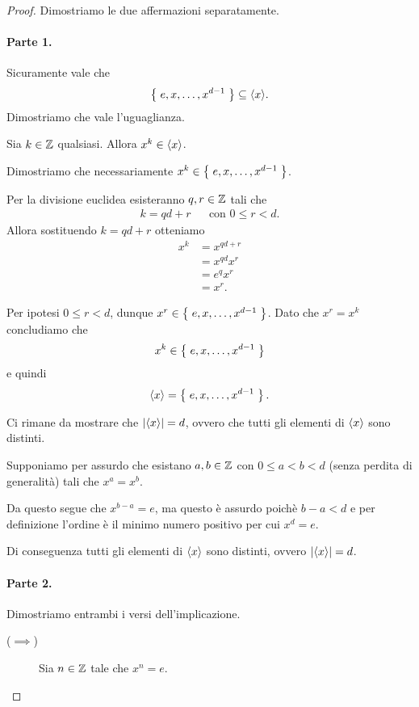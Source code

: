 \begin{proof}
    Dimostriamo le due affermazioni separatamente. 
    
    \paragraph{Parte 1.} Sicuramente vale che \[
        \set{e, x, \dots, x^{d-1}} \subseteq \cycl{x}.    
    \] Dimostriamo che vale l'uguaglianza.

    Sia $k \in \Z$ qualsiasi. Allora $x^k \in \cycl x$. 
    
    Dimostriamo che necessariamente $x^k \in \set{e, x, \dots, x^{d-1}}$.

    Per la divisione euclidea esisteranno $q, r \in \Z$ tali che \begin{align*}
        k = qd + r &&\text{con } 0 \leq r < d.
    \end{align*} Allora sostituendo $k = qd+r$ otteniamo \begin{align*}
        x^k &= x^{qd + r}\\
        &= x^{qd}x^r\\
        &= e^qx^r\\
        &= x^r.
    \end{align*}
    
    Per ipotesi $0 \leq r < d$, dunque $x^r \in \set{e, x, \dots, x^{d-1}}$. Dato che $x^r = x^k$ concludiamo che \[
        x^k \in \set{e, x, \dots, x^{d-1}}    
    \] e quindi \[
        \cycl x = \set{e, x, \dots, x^{d-1}}.    
    \]

    Ci rimane da mostrare che $\abs*{\cycl* x} = d$, ovvero che tutti gli elementi di $\cycl x$ sono distinti. 

    Supponiamo per assurdo che esistano $a, b \in \Z$ con $0 \leq a < b < d$ (senza perdita di generalità) tali che $x^a = x^b$.

    Da questo segue che $x^{b-a} = e$, ma questo è assurdo poichè $b-a < d$ e per definizione l'ordine è il minimo numero positivo per cui $x^d = e$.

    Di conseguenza tutti gli elementi di $\cycl x$ sono distinti, ovvero $\abs*{\cycl* x} = d$.

    \paragraph{Parte 2.} Dimostriamo entrambi i versi dell'implicazione.
    \begin{description}
        \item[($\implies$)] Sia $n \in \Z$ tale che $x^n = e$.
        

\end{description}
\end{proof}
